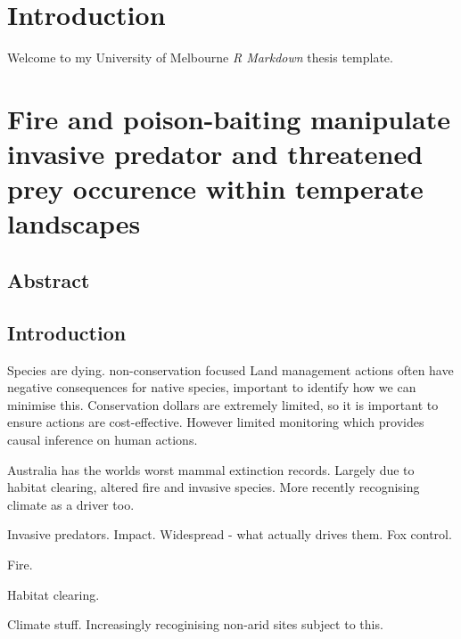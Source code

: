 \documentclass[11pt,a4paper,titlepage,twoside,openright]{style/unimelbthesis}
\begin{document}
%

\begin{mainmatter}

\hypertarget{introduction}{%
\chapter*{Introduction}\label{introduction}}

Welcome to my University of Melbourne \emph{R Markdown} thesis template.

\hypertarget{occ}{%
\chapter{Fire and poison-baiting manipulate invasive predator and threatened prey occurence within temperate landscapes}\label{occ}}

\hypertarget{abstract}{%
\section*{Abstract}\label{abstract}}

\hypertarget{introduction-1}{%
\section{Introduction}\label{introduction-1}}

Species are dying.
non-conservation focused Land management actions often have negative consequences for native species, important to identify how we can minimise this. Conservation dollars are extremely limited, so it is important to ensure actions are cost-effective. However limited monitoring which provides causal inference on human actions.

Australia has the worlds worst mammal extinction records.
Largely due to habitat clearing, altered fire and invasive species. More recently recognising climate as a driver too.

Invasive predators.
Impact.
Widespread - what actually drives them.
Fox control.

Fire.

Habitat clearing.

Climate stuff. Increasingly recoginising non-arid sites subject to this.


\end{mainmatter}
\end{document}
